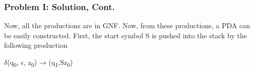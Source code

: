 \documentclass{beamer}
\begin{document}

\begin{frame}[fragile] %
	\frametitle{Problem I: Solution, Cont.}
	
	Now, all the productions are in GNF. Now, from these productions, a PDA can be easily constructed. First, the start symbol S is pushed into the stack by the following production
	\begin{center}
		$\delta$(q\textsubscript{0}, $\epsilon$, z\textsubscript{0}) → (q\textsubscript{1},Sz\textsubscript{0})
	\end{center}
	
\end{frame}

\end{document}
